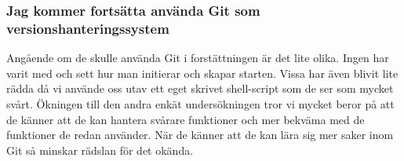 \subsubsection{Jag kommer fortsätta använda Git som versionshanteringssystem}

Angående om de skulle använda Git i forstättningen är det lite olika. Ingen har varit med och sett hur man initierar och skapar starten. Vissa har även blivit lite rädda då vi använde oss utav ett eget skrivet shell-script som de ser som mycket svårt. Ökningen till den andra enkät undersökningen tror vi mycket beror på att de känner att de kan hantera svårare funktioner och mer bekväma med de funktioner de redan använder. När de känner att de kan lära sig mer saker inom Git så minskar rädslan för det okända. 

